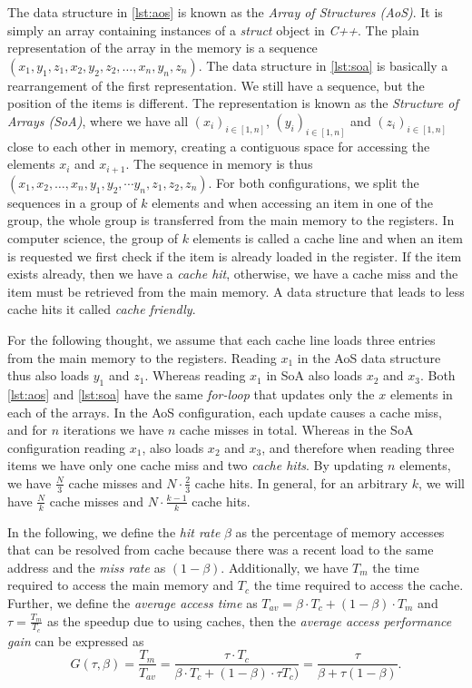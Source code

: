 The data structure in \autoref{lst:aos} is known as the \emph{Array of Structures (AoS)}. It is simply an array containing instances of a \emph{struct} object in \emph{C++}. The plain representation of the array in the memory is a sequence $(x_1, y_1, z_1, x_2, y_2, z_2, \dots, x_n, y_n, z_n)$. The data structure in \autoref{lst:soa} is basically a rearrangement of the first representation. We still have a sequence, but the position of the items is different. The representation is known as the \emph{Structure of Arrays (SoA)}, where we have all $(x_i)_{i \in[1, n]}$, $(y_i)_{i \in[1, n]}$ and $(z_i)_{i \in[1, n]}$ close to each other in memory, creating a contiguous space for accessing the elements $x_i$ and $x_{i+1}$. The sequence in memory is thus $(x_1, x_{2}, \dots, x_n, y_1, y_{2}, \cdots y_{n}, z_1, z_2, z_n)$.  For both configurations, we split the sequences in a group of $k$ elements and when accessing an item in one of the group, the whole group is transferred from the main memory to the registers. In computer science, the group of $k$ elements is called a cache line and when an item is requested we first check if the item is already loaded in the register. If the item exists already, then we have a \emph{cache hit}, otherwise, we have a cache miss and the item must be retrieved from the main memory. A data structure that leads to less cache hits it called \emph{cache friendly}.

For the following thought, we assume that each cache line loads three entries from the main memory to the registers. Reading $x_1$ in the AoS data structure thus also loads $y_1$ and $z_1$. Whereas reading $x_1$ in SoA also loads $x_2$ and $x_3$. Both \autoref{lst:aos} and \autoref{lst:soa} have the same \emph{for-loop} that updates only the $x$ elements in each of the arrays. In the AoS configuration, each update causes a cache miss, and for $n$ iterations we have $n$ cache misses in total. Whereas in the SoA configuration reading $x_1$, also loads $x_2$ and $x_3$, and therefore when reading three items we have only one cache miss and two \emph{cache hits}. By updating $n$ elements, we have $\frac{N}{3}$ cache misses and $N \cdot \frac{2}{3}$ cache hits. In general, for an arbitrary $k$, we will have $\frac{N}{k}$ cache misses and $N \cdot \frac{k-1}{k}$ cache hits.

In the following, we define the \emph{hit rate} $\beta$ as the percentage of memory accesses that can be resolved from cache because there was a recent load to the same address and the \emph{miss rate} as $(1 - \beta)$. Additionally, we have $T_m$ the time required to access the main memory and $T_c$ the time required to access the cache. Further, we define the \emph{average access time} as $T_{av} = \beta \cdot T_c + (1 - \beta) \cdot T_m$ and $\tau = \frac{T_m}{T_c}$ as the speedup due to using caches, then the \emph{average access performance gain} can be expressed as $$G(\tau, \beta) = \frac{T_m}{T_{av}} = \frac{\tau \cdot T_c}{\beta \cdot T_c + (1 - \beta)\cdot \tau T_c)} = \frac{\tau}{\beta + \tau (1 - \beta)}.$$

